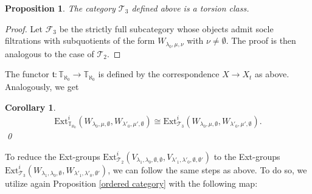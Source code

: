 \documentclass[openany, a4paper]{amsbook}
\newtheorem{prop}[thm]{Proposition}
\newtheorem{cor}[thm]{Corollary}
\theoremstyle{definition}
\numberwithin{equation}{chapter}
\newcommand{\T}[1]{{\mathbb{T}}_{\aleph_{#1}}}
\newcommand{\Ext}[4]{\mathrm{Ext}^{#1}_{#2}({#3}, {#4})}
\begin{document}
\begin{prop}
    The category $\mathcal{T}_3$ defined above is a torsion class. 
\end{prop}

\begin{proof}
    Let $\mathcal{F}_3$ be the strictly full subcategory whose objects admit socle filtrations with subquotients of the form $W_{\lambda_0, \mu, \nu}$ with $\nu \neq \emptyset$. The proof is then analogous to the case of $\mathcal{T}_2$.
    
\end{proof}

The functor $\mathfrak{t}: \T{0} \to \T{0}$ is defined by the correspondence $X \to X_t$ as above. Analogously, we get
\begin{cor}
    \begin{align}
        \Ext{i}{\T{0}}{W_{\lambda_0, \mu, \emptyset}}{W_{\lambda'_0, \mu', \emptyset}} 
        \cong 
        \Ext{i}{\mathcal{T}_3}{W_{\lambda_0, \mu, \emptyset}}{W_{\lambda'_0, \mu', \emptyset}}.
    \end{align}
    \qed
\end{cor}

To reduce the Ext-groups $\Ext{i}{\mathcal{T}_2}{V_{\lambda_1, \lambda_0, \emptyset, \emptyset}}{V_{\lambda'_1, \lambda'_0, \emptyset, \emptyset'}}$ to the Ext-groups $\Ext{i}{\mathcal{T}_3}{W_{\lambda_1, \lambda_0, \emptyset}}{W_{\lambda'_1, \lambda'_0, \emptyset'}}$, we can follow the same steps as above. To do so, we utilize again Proposition \ref{ordered category} with the following map:
\end{document}

